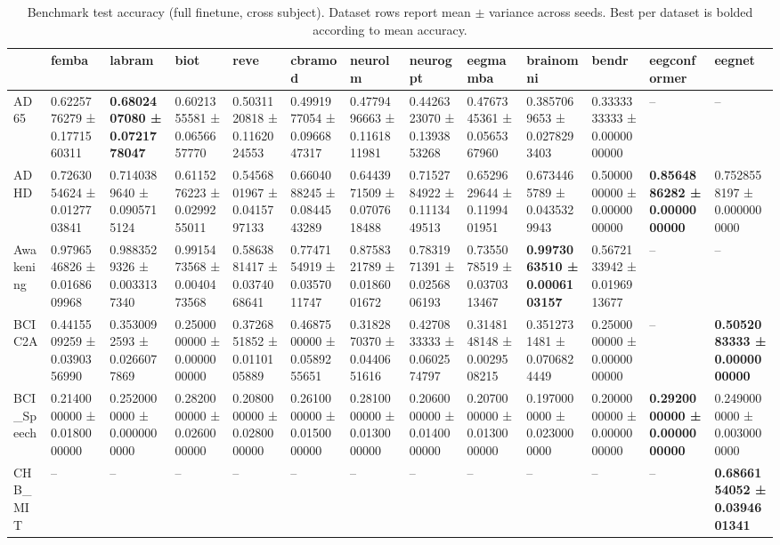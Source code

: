 \begin{table}[htbp]
\caption{Benchmark test accuracy (full finetune, cross subject). Dataset rows report mean $\pm$ variance across seeds. Best per dataset is bolded according to mean accuracy.}
\label{tab:benchmark_results_full_finetune_cross_subject}
\begin{tabular}{lllllllllllll}
\toprule
 & femba & labram & biot & reve & cbramod & neurolm & neurogpt & eegmamba & brainomni & bendr & eegconformer & eegnet \\
\midrule
AD65 & 0.6225776279 ± 0.1771560311 & \bfseries 0.6802407080 ± 0.0721778047 & 0.6021355581 ± 0.0656657770 & 0.5031120818 ± 0.1162024553 & 0.4991977054 ± 0.0966847317 & 0.4779496663 ± 0.1161811981 & 0.4426323070 ± 0.1393853268 & 0.4767345361 ± 0.0565367960 & 0.3857069653 ± 0.0278293403 & 0.3333333333 ± 0.0000000000 & -- & -- \\
ADHD & 0.7263054624 ± 0.0127703841 & 0.7140389640 ± 0.0905715124 & 0.6115276223 ± 0.0299255011 & 0.5456801967 ± 0.0415797133 & 0.6604088245 ± 0.0844543289 & 0.6443971509 ± 0.0707618488 & 0.7152784922 ± 0.1113449513 & 0.6529629644 ± 0.1199401951 & 0.6734465789 ± 0.0435329943 & 0.5000000000 ± 0.0000000000 & \bfseries 0.8564886282 ± 0.0000000000 & 0.7528558197 ± 0.0000000000 \\
Awakening & 0.9796546826 ± 0.0168609968 & 0.9883529326 ± 0.0033137340 & 0.9915473568 ± 0.0040473568 & 0.5863881417 ± 0.0374068641 & 0.7747154919 ± 0.0357011747 & 0.8758321789 ± 0.0186001672 & 0.7831971391 ± 0.0256806193 & 0.7355078519 ± 0.0370313467 & \bfseries 0.9973063510 ± 0.0006103157 & 0.5672133942 ± 0.0196913677 & -- & -- \\
BCIC2A & 0.4415509259 ± 0.0390356990 & 0.3530092593 ± 0.0266077869 & 0.2500000000 ± 0.0000000000 & 0.3726851852 ± 0.0110105889 & 0.4687500000 ± 0.0589255651 & 0.3182870370 ± 0.0440651616 & 0.4270833333 ± 0.0602574797 & 0.3148148148 ± 0.0029508215 & 0.3512731481 ± 0.0706824449 & 0.2500000000 ± 0.0000000000 & -- & \bfseries 0.5052083333 ± 0.0000000000 \\
BCI_Speech & 0.2140000000 ± 0.0180000000 & 0.2520000000 ± 0.0000000000 & 0.2820000000 ± 0.0260000000 & 0.2080000000 ± 0.0280000000 & 0.2610000000 ± 0.0150000000 & 0.2810000000 ± 0.0130000000 & 0.2060000000 ± 0.0140000000 & 0.2070000000 ± 0.0130000000 & 0.1970000000 ± 0.0230000000 & 0.2000000000 ± 0.0000000000 & \bfseries 0.2920000000 ± 0.0000000000 & 0.2490000000 ± 0.0030000000 \\
CHB_MIT & -- & -- & -- & -- & -- & -- & -- & -- & -- & -- & -- & \bfseries 0.6866154052 ± 0.0394601341 \\

\end{tabular}
\end{table}
